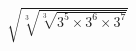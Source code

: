 \documentclass[preview]{standalone}
\begin{document}
\begin{align*}
\sqrt{\sqrt[3]{\sqrt[3]{3^5 \times 3^6 \times 3^7}}}
\end{align*}
\end{document}
